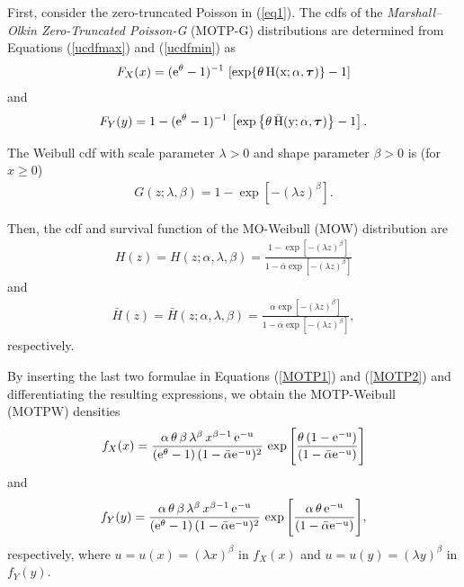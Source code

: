 \documentclass[12pt]{article}
\begin{document}
First, consider the zero-truncated Poisson in (\ref{eq1}). The cdfs of the {\it Marshall--Olkin Zero-Truncated Poisson-G} (MOTP-G)
distributions are determined from Equations (\ref{ucdfmax}) and (\ref{ucdfmin}) as
\begin{eqnarray}\label{MOTP1}
F_X(x)=(\rm{e}^\theta-1)^{-1}\,\left[\exp\{\theta\,H(x;\alpha,\bm{\tau})\}-1\right]
\end{eqnarray}
and
\begin{eqnarray}\label{MOTP2}
F_Y(y)=1-(\rm{e}^\theta-1)^{-1}\,\left[\exp\left\{\theta\,\bar{H}(y;\alpha,\bm{\tau})\right\}-1\right].
\end{eqnarray}

The Weibull cdf with scale parameter $\lambda>0$ and shape parameter $\beta>0$ is (for $x \ge 0$)
\begin{eqnarray*}
G(z;\lambda,\beta) =1-\exp\left[-(\lambda z)^{\beta}\right].
\end{eqnarray*}

Then, the cdf and survival function of the MO-Weibull (MOW) distribution are
\begin{eqnarray*}\label{cdfMOW}
H(z)=H(z;\alpha,\lambda,\beta)=\frac{1-\exp\left[-(\lambda z)^{\beta}\right]}{1-\bar{\alpha}\exp \left[ -(\lambda z)^{\beta}\right]}
\end{eqnarray*}
and
\begin{eqnarray*}\label{sfMOW}
\bar{H}(z)=\bar{H}(z;\alpha,\lambda,\beta)=\frac{\alpha\exp\left[ -(\lambda z)^{\beta}\right]}{1-\bar{\alpha}\exp\left[ -(\lambda z)^{\beta}\right]},
\end{eqnarray*}
respectively.

By inserting the last two formulae in Equations (\ref{MOTP1}) and (\ref{MOTP2}) and differentiating the resulting
expressions, we obtain the MOTP-Weibull (MOTPW) densities
\begin{eqnarray}\label{MOTPW1}
f_X(x)=\frac{\alpha\,\theta\,\beta\,\lambda^{\beta}\,x^{\beta-1}\,\rm{e}^{-u}}{(\rm{e}^\theta-1)\,(1-\bar{\alpha}\rm{e}^{-u})^2}\,
\exp\Bigg[\frac{\theta\,(1-\rm{e}^{-u})}{(1-\bar{\alpha}\rm{e}^{-u})}\Bigg]
\end{eqnarray}
and
\begin{eqnarray}\label{MOTPW2}
f_Y(y)=\frac{\alpha\,\theta\,\beta\,\lambda^{\beta}\,x^{\beta-1}\,\rm{e}^{-u}}{(\rm{e}^\theta-1)\,(1-\bar{\alpha}\rm{e}^{-u})^2}\,
\exp\Bigg[\frac{\alpha\,\theta\,\rm{e}^{-u}}{(1-\bar{\alpha}\rm{e}^{-u})}\Bigg],
\end{eqnarray}
respectively, where $u=u(x)=(\lambda x)^\beta$ in $f_X(x)$ and $u=u(y)=(\lambda y)^\beta$ in $f_Y(y)$.
\end{document}
